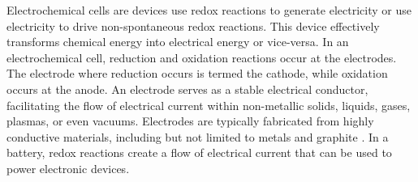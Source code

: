 Electrochemical cells are devices use redox reactions to generate electricity or use electricity to drive non-spontaneous redox reactions. This device effectively transforms chemical energy into electrical energy or vice-versa. In an electrochemical cell, reduction and oxidation reactions occur at the electrodes. The electrode where reduction occurs is termed the cathode, while oxidation occurs at the anode. An electrode serves as a stable electrical conductor, facilitating the flow of electrical current within non-metallic solids, liquids, gases, plasmas, or even vacuums. Electrodes are typically fabricated from highly conductive materials, including but not limited to metals and graphite \cite{goldbook}. In a battery, redox reactions create a flow of electrical current that can be used to power electronic devices.

